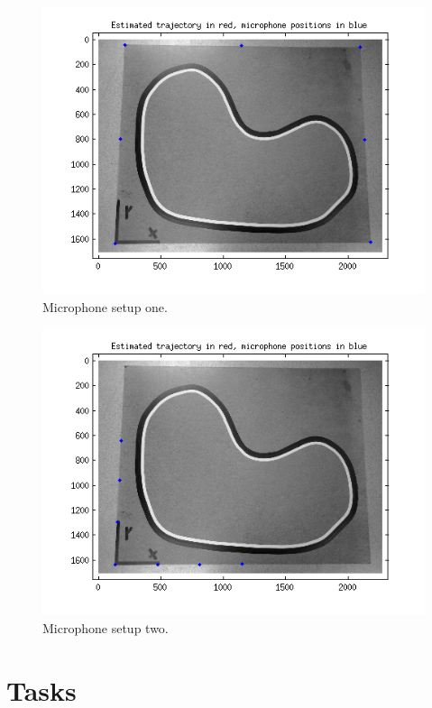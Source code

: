 \documentclass[10pt,a4paper]{report}
\begin{document}
\begin{figure}[!h]
  \caption{Microphone setup one.}
  \label{good_setup}
  \includegraphics[scale=0.9]{microphone_pos_good.png}
\end{figure}

\begin{figure}[!h]
  \caption{Microphone setup two.}
  \label{bad_setup}
  \includegraphics[scale=0.9]{microphone_pos_bad.png}
\end{figure}

\newpage
\chapter{Tasks}
\label{Tasks}
\end{document}
